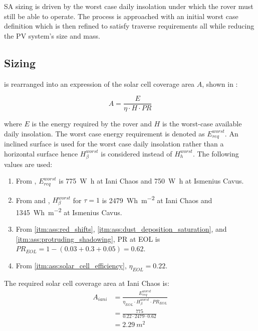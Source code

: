 \ac{SA} sizing is driven by the worst case daily insolation under which the rover must still be able to operate. The process is approached with an initial worst case definition which is then refined to satisfy traverse requirements all while reducing the \ac{PV} system's size and mass.

\subsection{Sizing}
 is rearranged into an expression of the solar cell coverage area $A$, shown in :

\begin{equation}
  \label{eq:solar_cell_coverage_area}
  A = \frac{E}{\eta \cdot H \cdot PR}
\end{equation}

where $E$ is the energy required by the rover and $H$ is the worst-case available daily insolation. The worst case energy requirement is denoted as $E_{req}^{worst}$. An inclined surface is used for the worst case daily insolation rather than a horizontal surface hence $H_{\beta}^{worst}$ is considered instead of $H_{h}^{worst}$. The following values are used:

\begin{enumerate}[label=\textcolor{BulletBlue}{(\alph*)}]
    \item From , $E_{req}^{worst}$ is \SI{775}{\watt\hour} at Iani Chaos and \SI{750}{\watt\hour} at Ismenius Cavus.
    \item From  and , $H_{\beta}^{worst}$ for $\tau=1$ is \SI{2479}{Wh.m^{-2}} at Iani Chaos and \SI{1345}{Wh.m^{-2}} at Ismenius Cavus.
    \item From \ref{itm:ass:red_shifts}, \ref{itm:ass:dust_deposition_saturation}, and \ref{itm:ass:protruding_shadowing}, \ac{PR} at \ac{EOL} is $PR_{EOL} = 1 - (0.03 + 0.3 + 0.05) = 0.62$.
    \item From \ref{itm:ass:solar_cell_efficiency}, $\eta_{EOL} = 0.22$.
\end{enumerate}


The required solar cell coverage area at Iani Chaos is:
\begin{align}
  \label{calc:solar_cell_area_iani_chaos_traverse}
  A_{iani} &= \frac{E_{req}^{worst}}{\eta_{EOL} \cdot H_{\beta}^{worst} \cdot PR_{EOL}}\\
           &= \frac{775}{0.22 \cdot 2479 \cdot 0.62}\\
           &= \SI{2.29}{m^{2}}
\end{align}

